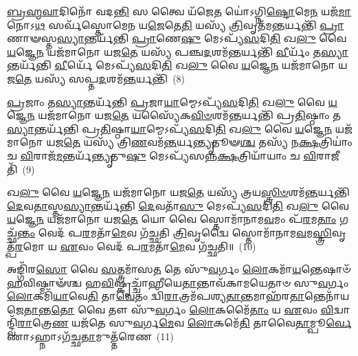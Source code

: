 \-\ul{𑌬𑍍𑌰}\-\-\ul{𑌹𑍍𑌮}\-\-\ul{𑌵𑌾}\-𑌦𑌿𑌨𑍋᳴ 𑌵𑌦\-\ul{𑌨𑍍𑌤𑌿} 𑌸 𑌤𑍍𑌵𑍈 𑌯᳴𑌜𑍇\-\ul{𑌤} 𑌯𑍋॑\-𑌽𑌗𑍍𑌨𑌿\-\ul{𑌷𑍍𑌟𑍋}\-𑌮𑍇\-\ul{𑌨} 𑌯𑌜᳴\-\ul{𑌮𑌾}\-𑌨𑍋\-𑌽\-\ul{𑌥} 𑌸𑌰𑍍𑌵᳴𑌸𑍍𑌤𑍋𑌮𑍇\-\ul{𑌨} 𑌯\-\ul{𑌜𑍇}\-𑌤𑍇\-\ul{𑌤𑌿} 𑌯𑌸𑍍𑌯᳴ \ul{𑌤𑍍𑌰𑌿}\-𑌵𑍃𑌤᳴𑌮\-\ul{𑌨𑍍𑌤}\-𑌰𑍍𑌯𑌨𑍍𑌤𑌿᳴ \ul{𑌪𑍍𑌰𑌾}\-𑌣𑌾𑍟𑌸𑍍𑌤\-\ul{𑌸𑍍𑌯𑌾}\-𑌨𑍍𑌤𑌰𑍍𑌯᳴𑌨𑍍𑌤𑌿 \ul{𑌪𑍍𑌰𑌾}\-𑌣𑍇\-\ul{𑌷𑍁} 𑌮𑍇\-𑌽𑌪𑍍𑌯᳴\-\ul{𑌸}\-𑌦𑌿\-\ul{𑌤𑌿} 𑌖\-\ul{𑌲𑍁} 𑌵𑍈 \ul{𑌯}\-𑌜𑍍𑌞𑍇\-\ul{𑌨} 𑌯𑌜᳴𑌮𑌾𑌨𑍋 𑌯𑌜\-\ul{𑌤𑍇} 𑌯𑌸𑍍𑌯᳴ 𑌪𑌞𑍍𑌚\-\ul{𑌦}\-𑌶𑌮᳴\-\ul{𑌨𑍍𑌤}\-𑌰𑍍𑌯𑌨𑍍𑌤𑌿᳴ \ul{𑌵𑍀}\-𑌰𑍍𑌯𑌂᳴ 𑌤\-\ul{𑌸𑍍𑌯𑌾}\-𑌨𑍍𑌤𑌰𑍍𑌯᳴𑌨𑍍𑌤𑌿 \ul{𑌵𑍀}\-𑌰𑍍𑌯𑍇᳴ 𑌮𑍇\-𑌽𑌪𑍍𑌯᳴\-\ul{𑌸}\-𑌦𑌿\-\ul{𑌤𑌿} 𑌖\-\ul{𑌲𑍁} 𑌵𑍈 \ul{𑌯}\-𑌜𑍍𑌞𑍇\-\ul{𑌨} 𑌯𑌜᳴𑌮𑌾𑌨𑍋 𑌯𑌜\-\ul{𑌤𑍇} 𑌯𑌸𑍍𑌯᳴ 𑌸𑌪𑍍𑌤\-\ul{𑌦}\-𑌶𑌮᳴\-\ul{𑌨𑍍𑌤}\-𑌰𑍍𑌯𑌨𑍍𑌤𑌿᳴~(8)

\-\ul{𑌪𑍍𑌰}\-𑌜𑌾𑌂 𑌤\-\ul{𑌸𑍍𑌯𑌾}\-𑌨𑍍𑌤𑌰𑍍𑌯᳴𑌨𑍍𑌤𑌿 \ul{𑌪𑍍𑌰}\-𑌜𑌾\-\ul{𑌯𑌾}\-𑌮𑍍𑌮𑍇\-𑌽𑌪𑍍𑌯᳴\-\ul{𑌸}\-𑌦𑌿\-\ul{𑌤𑌿} 𑌖\-\ul{𑌲𑍁} 𑌵𑍈 \ul{𑌯}\-𑌜𑍍𑌞𑍇\-\ul{𑌨} 𑌯𑌜᳴𑌮𑌾𑌨𑍋 𑌯𑌜\-\ul{𑌤𑍇} 𑌯𑌸𑍍𑌯𑍈᳴𑌕\-\ul{𑌵𑌿}\-\-\ul{𑍞}\-𑌶𑌮᳴\-\ul{𑌨𑍍𑌤}\-𑌰𑍍𑌯𑌨𑍍𑌤𑌿᳴ 𑌪𑍍𑌰\-\ul{𑌤𑌿}\-𑌷𑍍𑌠𑌾𑌂 𑌤\-\ul{𑌸𑍍𑌯𑌾}\-𑌨𑍍𑌤𑌰𑍍𑌯᳴𑌨𑍍𑌤𑌿 𑌪𑍍𑌰\-\ul{𑌤𑌿}\-𑌷𑍍𑌠𑌾\-\ul{𑌯𑌾}\-𑌮𑍍𑌮𑍇\-𑌽𑌪𑍍𑌯᳴\-\ul{𑌸}\-𑌦𑌿\-\ul{𑌤𑌿} 𑌖\-\ul{𑌲𑍁} 𑌵𑍈 \ul{𑌯}\-𑌜𑍍𑌞𑍇\-\ul{𑌨} 𑌯𑌜᳴𑌮𑌾𑌨𑍋 𑌯𑌜\-\ul{𑌤𑍇} 𑌯𑌸𑍍𑌯᳴ 𑌤𑍍𑌰𑌿\-\ul{𑌣}\-𑌵𑌮᳴\-\ul{𑌨𑍍𑌤}\-𑌰𑍍𑌯\-\ul{𑌨𑍍𑌤𑍍𑌯𑍃}\-𑌤𑍂𑍟\-\ul{𑌶𑍍𑌚} 𑌤𑌸𑍍𑌯᳴ 𑌨\-\ul{𑌕𑍍𑌷}\-𑌤𑍍𑌰𑌿𑌯𑌾𑌂॑ 𑌚 \ul{𑌵𑌿}\-𑌰𑌾𑌜᳴\-\ul{𑌮}\-𑌨𑍍𑌤𑌰𑍍𑌯᳴\-\ul{𑌨𑍍𑌤𑍍𑌯𑍃}\-𑌤𑍁\-\ul{𑌷𑍁} 𑌮𑍇\-𑌽𑌪𑍍𑌯᳴𑌸𑌨𑍍𑌨\-\ul{𑌕𑍍𑌷}\-𑌤𑍍𑌰𑌿𑌯𑌾᳴𑌯𑌾𑌂 𑌚 \ul{𑌵𑌿}\-𑌰𑌾𑌜𑍀𑌤𑌿᳴~(9)

𑌖\-\ul{𑌲𑍁} 𑌵𑍈 \ul{𑌯}\-𑌜𑍍𑌞𑍇\-\ul{𑌨} 𑌯𑌜᳴𑌮𑌾𑌨𑍋 𑌯𑌜\-\ul{𑌤𑍇} 𑌯𑌸𑍍𑌯᳴ 𑌤𑍍𑌰𑌯\-\ul{𑌸𑍍𑌤𑍍𑌰𑌿}\-\-\ul{𑍞}\-𑌶𑌮᳴\-\ul{𑌨𑍍𑌤}\-𑌰𑍍𑌯𑌨𑍍𑌤𑌿᳴ \ul{𑌦𑍇}\-𑌵\-\ul{𑌤𑌾}\-𑌸𑍍𑌤\-\ul{𑌸𑍍𑌯𑌾}\-𑌨𑍍𑌤𑌰𑍍𑌯᳴𑌨𑍍𑌤𑌿 \ul{𑌦𑍇}\-𑌵𑌤𑌾᳴\-\ul{𑌸𑍁} 𑌮𑍇\-𑌽𑌪𑍍𑌯᳴\-\ul{𑌸}\-𑌦𑌿\-\ul{𑌤𑌿} 𑌖\-\ul{𑌲𑍁} 𑌵𑍈 \ul{𑌯}\-𑌜𑍍𑌞𑍇\-\ul{𑌨} 𑌯𑌜᳴𑌮𑌾𑌨𑍋 𑌯𑌜\-\ul{𑌤𑍇} 𑌯𑍋 𑌵𑍈 𑌸𑍍𑌤𑍋𑌮𑌾᳴𑌨𑌾𑌮\-\ul{𑌵}\-𑌮𑌂 𑌪᳴\-\ul{𑌰}\-𑌮\-\ul{𑌤𑌾𑌂} 𑌗𑌚𑍍𑌛᳴\-\ul{𑌨𑍍𑌤𑌂} 𑌵𑍇𑌦᳴ 𑌪\-\ul{𑌰}\-𑌮𑌤𑌾᳴\-\ul{𑌮𑍇}\-𑌵 𑌗᳴𑌚𑍍𑌛𑌤𑌿 \ul{𑌤𑍍𑌰𑌿}\-𑌵𑍃𑌦𑍍𑌵𑍈 𑌸𑍍𑌤𑍋𑌮𑌾᳴𑌨𑌾𑌮\-\ul{𑌵}\-𑌮\-\-\ul{𑌸𑍍𑌤𑍍𑌰𑌿}\-𑌵𑍃𑌤𑍍𑌪᳴\-\ul{𑌰}\-𑌮𑍋 𑌯 \ul{𑌏}\-𑌵𑌂 𑌵𑍇𑌦᳴ 𑌪\-\ul{𑌰}\-𑌮𑌤𑌾᳴\-\ul{𑌮𑍇}\-𑌵 𑌗᳴𑌚𑍍𑌛𑌤𑌿॥~(10)

{\anuvakamend[{\-\ul{𑌸}\-\-\ul{𑌪𑍍𑌤}\-\-\ul{𑌦}\-𑌶𑌮᳴\-\ul{𑌨𑍍𑌤}\-𑌰𑍍𑌯𑌨𑍍𑌤𑌿᳴ \ul{𑌵𑌿}\-𑌰𑌾𑌜𑍀\-\ul{𑌤𑌿} 𑌚𑌤𑍁᳴𑌶𑍍𑌚𑌤𑍍𑌵𑌾𑌰𑌿𑍞𑌶𑌚𑍍𑌚}]}%

𑌅𑌙𑍍𑌗𑌿᳴𑌰\-\ul{𑌸𑍋} 𑌵𑍈 \ul{𑌸}\-𑌤𑍍𑌤𑍍𑌰𑌮𑌾᳴𑌸\-\ul{𑌤} 𑌤𑍇 𑌸𑍁᳴\-\ul{𑌵}\-𑌰𑍍𑌗𑌂 \ul{𑌲𑍋}\-𑌕𑌮𑌾᳴\-\ul{𑌯}\-𑌨𑍍𑌤𑍇𑌷𑌾𑍞᳴ \ul{𑌹}\-𑌵𑌿𑌷𑍍𑌮𑌾𑍟᳴𑌶𑍍𑌚 𑌹\-\ul{𑌵𑌿}\-𑌷𑍍𑌕𑍃𑌚𑍍𑌚𑌾᳴𑌹𑍀𑌯𑍇\-\ul{𑌤𑌾}\-𑌨𑍍𑌤𑌾𑌵᳴𑌕𑌾𑌮𑌯𑍇𑌤𑌾𑍞 𑌸𑍁\-\ul{𑌵}\-𑌰𑍍𑌗𑌂 \ul{𑌲𑍋}\-𑌕𑌮𑌿᳴\-\ul{𑌯𑌾}\-𑌵𑍇\-\ul{𑌤𑌿} 𑌤𑌾\-\ul{𑌵𑍇}\-𑌤𑌂 𑌦𑍍𑌵𑌿᳴\-\ul{𑌰𑌾}\-𑌤𑍍𑌰𑌮᳴𑌪𑌶𑍍𑌯\-\ul{𑌤𑌾}\-𑌨𑍍𑌤𑌮𑌾𑌹᳴𑌰\-\ul{𑌤𑌾}\-𑌨𑍍𑌤𑍇𑌨𑌾᳴𑌯𑌜𑍇\-\ul{𑌤𑌾}\-𑌨𑍍𑌤\-\ul{𑌤𑍋} 𑌵𑍈 𑌤𑍗 𑌸𑍁᳴\-\ul{𑌵}\-𑌰𑍍𑌗𑌂 \ul{𑌲𑍋}\-𑌕𑌮𑍈᳴\-\ul{𑌤𑌾𑌂} 𑌯 \ul{𑌏}\-𑌵𑌂 \ul{𑌵𑌿}\-𑌦𑍍𑌵𑌾𑌨𑍍𑌦𑍍𑌵𑌿᳴\-\ul{𑌰𑌾}\-𑌤𑍍𑌰𑍇\-\ul{𑌣} 𑌯𑌜᳴𑌤𑍇 𑌸𑍁\-\ul{𑌵}\-𑌰𑍍𑌗\-\ul{𑌮𑍇}\-𑌵 \ul{𑌲𑍋}\-𑌕𑌮𑍇᳴\-\ul{𑌤𑌿} 𑌤𑌾𑌵𑍈\-\ul{𑌤𑌾}\-𑌮𑍍𑌪𑍂\-\ul{𑌰𑍍𑌵𑍇}\-𑌣𑌾\-𑌽𑌹𑍍𑌨𑌾\-𑌽𑌗᳴𑌚𑍍𑌛\-\ul{𑌤𑌾}\-𑌮𑍁𑌤𑍍𑌤᳴𑌰𑍇𑌣~(11)

